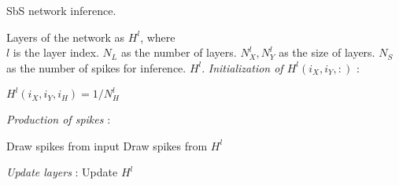 \section*{}
\subsection{}
\label{sec:appendix_sbs_algorithm}


\begin{algorithm}[h!]
	\label{alg:inference}
	\caption{SbS network inference.}
	
	\begin{algorithmic}[1]
		\SetAlgoLined
		\renewcommand{\algorithmicrequire}{\textbf{input:}}
		\renewcommand{\algorithmicensure}{\textbf{output:}}
		\REQUIRE Layers of the network as $H^l$, where\\
		$l$ is the layer index.
		\REQUIRE $N_{L}$ as the number of layers.
		\REQUIRE $N^l_{X}, N^l_{Y}$ as the size of layers.
		\REQUIRE $N_{S}$ as the number of spikes for inference.
		\ENSURE $H^l$.
		\textit{Initialization of $H^l(i_X,i_Y,:)$} :
		
		\STATE $H^l(i_X,i_Y,i_{H}) = 1/N^l_H$
		\ENDFOR
		\ENDFOR
		\ENDFOR
		\ENDIF
		
		\textit{Production of spikes} :
		
		\STATE Draw spikes from input 
		\ELSE
		\STATE Draw spikes from $H^l$ 
		\ENDIF
		
		\ENDFOR
		
		\textit{Update layers} :
		\STATE Update $H^l$ 
		\ENDFOR
		
		\ENDFOR
	\end{algorithmic} 
\end{algorithm}


